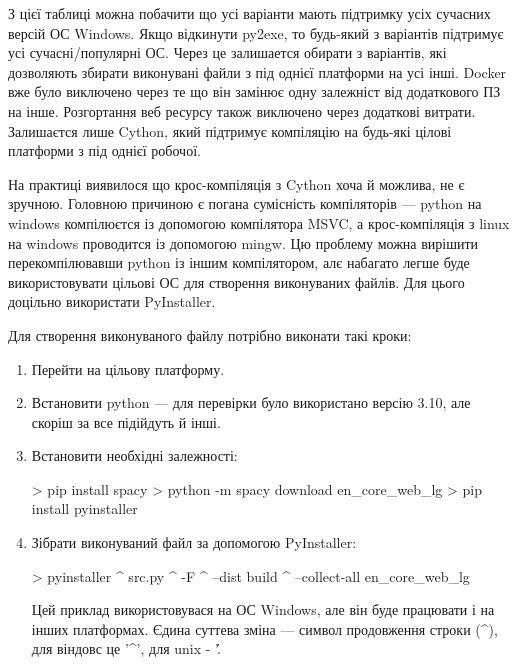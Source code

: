 \documentclass[14pt]{extarticle}
\begin{document}
  \newpage
  З цієї таблиці можна побачити що усі варіанти мають
  підтримку усіх сучасних версій ОС Windows.
  Якщо відкинути py2exe,
  то будь-який з варіантів підтримує усі сучасні/популярні ОС.
  Через це залишается обирати з варіантів,
  які дозволяють збирати виконувані файли з під однієї платформи на усі інші.
  Docker вже було виключено через
  те що він замінює одну залежніст від додаткового ПЗ на інше.
  Розгортання веб ресурсу також виключено через додаткові витрати.
  Залишаєтся лише Cython, який підтримує компіляцію на
  будь-які цілові платформи з під однієї робочої.

  На практиці виявилося що крос-компіляція з Cython хоча й можлива,
  не є зручною. Головною причиною є погана сумісність компіляторів ---
  python на windows компілюєтся із допомогою компілятора MSVC,
  а крос-компіляція з linux на windows проводится із допомогою mingw.
  Цю проблему можна вирішити перекомпілювавши python із іншим компілятором,
  алє набагато легше буде використовувати цільові ОС для створення
  виконуваних файлів. Для цього доцільно використати PyInstaller.

  Для створення виконуваного файлу потрібно виконати такі кроки:
  \begin{enumerate}[labelindent=\dimexpr\parindent*2\relax, leftmargin=*]
    \item Перейти на цільову платформу.
    \item Встановити python --- для перевірки було використано версію 3.10,
      але скоріш за все підійдуть й інші.
    \item Встановити необхідні залежності:
      \begin{mycode}[caption={Встановлення залежностей}, label={code:install_deps}]
        > pip install spacy
        > python -m spacy download en_core_web_lg
        > pip install pyinstaller
      \end{mycode}
    \item Зібрати виконуваний файл за допомогою PyInstaller:
    \begin{mycode}[caption={Збірка виконуваного файлу}, label={code:install_deps}]
      > pyinstaller ^
          src\main.py ^
          -F ^
          --dist build ^
          --collect-all en_core_web_lg
    \end{mycode}
    Цей приклад використовувася на ОС Windows,
    але він буде працювати і на інших платформах. Єдина суттева зміна ---
    символ продовження строки (\string^), для віндовс це '\string^',
    для unix - '\string\'.
  \end{enumerate}
\end{document}
